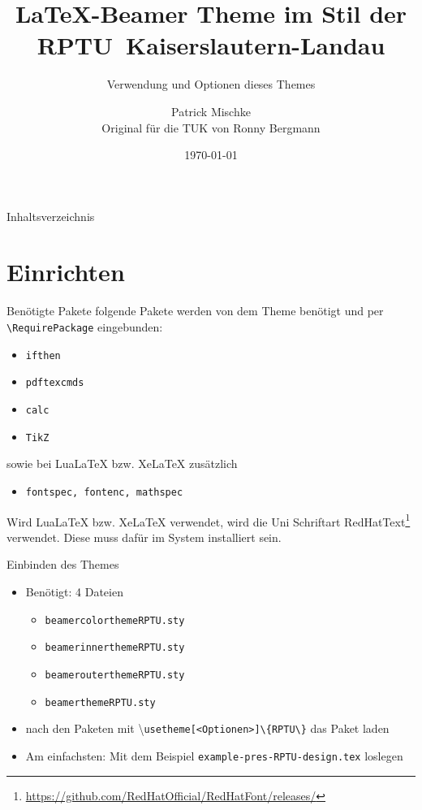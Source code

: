 \documentclass[german,10pt,compress]{beamer}
\title{\LaTeX-Beamer Theme im Stil der \mbox{RPTU Kaiserslautern-Landau}}
\subtitle{Verwendung und Optionen dieses Themes}
\date[]{\today}
\author[P. Mischke]{Patrick Mischke\\Original für die TUK von Ronny Bergmann}
\institute[]{AG Ott\\FB Physik\\RPTU Kaiserslautern}
\begin{document}
\maketitle
\begin{frame}{Inhaltsverzeichnis}
	\tableofcontents
\end{frame}
\section{Einrichten}
\begin{frame}[fragile]{Benötigte Pakete}
	folgende Pakete werden von dem Theme benötigt und per \lstinline!\RequirePackage! eingebunden:
	\begin{itemize}
		\item \lstinline!ifthen!
		\item \lstinline!pdftexcmds!
		\item \lstinline!calc!
		\item \lstinline!TikZ!
	\end{itemize}\vspace{\baselineskip}
	sowie bei LuaLaTeX bzw. XeLaTeX zusätzlich
	\begin{itemize}
		\item \lstinline!fontspec, fontenc, mathspec!
	\end{itemize}\vspace{\baselineskip}
	Wird LuaLaTeX bzw. XeLaTeX verwendet, wird die Uni Schriftart RedHatText\footnote{\url{https://github.com/RedHatOfficial/RedHatFont/releases/}} verwendet.
	Diese muss dafür im System installiert sein.
\end{frame}
\begin{frame}{Einbinden des Themes}
	\begin{itemize}
		\item Benötigt: 4 Dateien
		      \begin{itemize}
			      \item \lstinline|beamercolorthemeRPTU.sty|
			      \item \lstinline|beamerinnerthemeRPTU.sty|
			      \item \lstinline!beamerouterthemeRPTU.sty!
			      \item \lstinline|beamerthemeRPTU.sty|
		      \end{itemize}

		\item nach den Paketen mit \textbackslash\lstinline|usetheme[<Optionen>]\{RPTU\}| das Paket laden
		\item Am einfachsten: Mit dem Beispiel \lstinline!example-pres-RPTU-design.tex! loslegen
	\end{itemize}
\end{frame}
\end{document}
